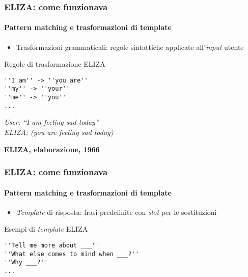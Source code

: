 %
\begin{frame}[t,fragile] \frametitle{ELIZA: come funzionava}
	{\small
		\framesubtitle{Pattern matching e trasformazioni di template}
		\begin{itemize}[leftmargin=10pt,align=right]
			\item[\alert{\faHandORight}] \alert{Trasformazioni grammaticali:} regole sintattiche applicate all'\textit{input} utente
		\end{itemize}
		\vspace*{.3cm}
		\hspace*{4cm}
		\begin{shellcodeblock}{Regole di trasformazione ELIZA}
        	\begin{verbatim}
''I am'' -> ''you are''
''my'' -> ''your''
''me'' -> ''you''
...
        	\end{verbatim}
    	\end{shellcodeblock}
		\hspace*{4cm}
		\begin{minipage}[t]{.6\textwidth}
			\renewcommand{\epigraphsize}{\scriptsize}
			\setlength{\afterepigraphskip}{0pt}
			\setlength{\beforeepigraphskip}{5pt}
			\setlength{\epigraphwidth}{0.9\textwidth}
			\epigraph{\textit{\alert{User:} ``\alert{I am} feeling sad today''\\
			\alert{ELIZA:} (\alert{you are} feeling sad today)}}{\textbf{ELIZA, elaborazione, 1966}}
		\end{minipage}
	}
\end{frame}
%
\begin{frame}[t,fragile] \frametitle{ELIZA: come funzionava}
	{\small
		\framesubtitle{Pattern matching e trasformazioni di template}
		\begin{itemize}[leftmargin=10pt,align=right]
			\item[\alert{\faHandORight}] \alert{\textit{Template} di risposta:} frasi predefinite con \textit{slot} per le sostituzioni
		\end{itemize}
		\vspace*{.3cm}
		\hspace*{4cm}
		\begin{shellcodeblock}{Esempi di \textit{template} ELIZA}
        	\begin{verbatim}
''Tell me more about ___''
''What else comes to mind when ___?''
''Why ___?''
...
        	\end{verbatim}
    	\end{shellcodeblock}
	}
\end{frame}
